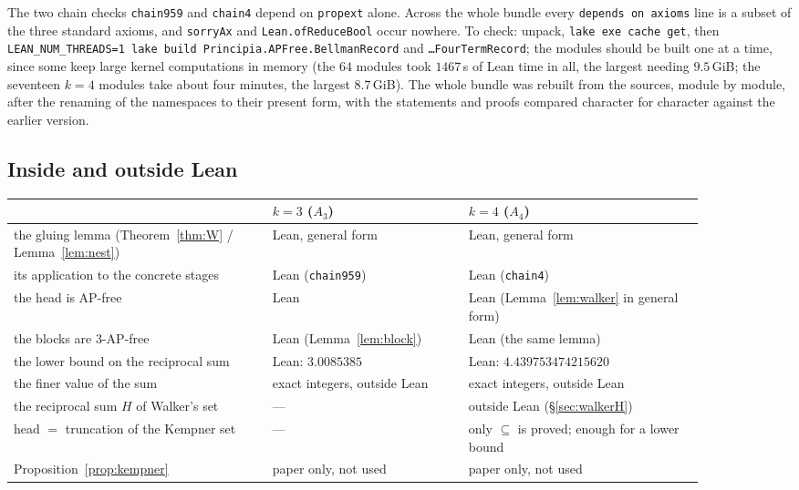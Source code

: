 \documentclass[11pt,a4paper]{article}
\theoremstyle{definition}
\theoremstyle{remark}
\newcommand{\code}[1]{\texttt{#1}}
\begin{document}
The two chain checks \code{chain959} and \code{chain4} depend on \code{propext} alone. Across the whole bundle every \code{depends on axioms} line is a subset of the three standard axioms, and \code{sorryAx} and \code{Lean.\allowbreak{}ofReduceBool} occur nowhere. To check: unpack, \code{lake exe cache get}, then \code{LEAN\_\allowbreak{}NUM\_\allowbreak{}THREADS=1 lake build Principia.\allowbreak{}APFree.\allowbreak{}BellmanRecord} and \code{\dots\allowbreak{}FourTermRecord}; the modules should be built one at a time, since some keep large kernel computations in memory (the $64$ modules took $1467$\,s of Lean time in all, the largest needing $9.5$\,GiB; the seventeen $k=4$ modules take about four minutes, the largest $8.7$\,GiB). The whole bundle was rebuilt from the sources, module by module, after the renaming of the namespaces to their present form, with the statements and proofs compared character for character against the earlier version.

\subsection{Inside and outside Lean}\label{sec:checked}

\begin{center}\small
\begin{tabular}{@{}>{\raggedright\arraybackslash}p{0.33\linewidth}>{\raggedright\arraybackslash}p{0.25\linewidth}>{\raggedright\arraybackslash}p{0.30\linewidth}@{}}
\toprule
 & $k=3$ ($A_3$) & $k=4$ ($A_4$) \\
\midrule
the gluing lemma (Theorem~\ref{thm:W} / Lemma~\ref{lem:nest}) & Lean, general form & Lean, general form \\
its application to the concrete stages & Lean (\code{chain959}) & Lean (\code{chain4}) \\
the head is AP-free & Lean & Lean (Lemma~\ref{lem:walker} in general form) \\
the blocks are 3-AP-free & Lean (Lemma~\ref{lem:block}) & Lean (the same lemma) \\
the lower bound on the reciprocal sum & Lean: $3.0085385$ & Lean: $4.439753474215620$ \\
the finer value of the sum & exact integers, outside Lean & exact integers, outside Lean \\
the reciprocal sum $H$ of Walker's set & --- & outside Lean (\S\ref{sec:walkerH}) \\
head $=$ truncation of the Kempner set & --- & only $\subseteq$ is proved; enough for a lower bound \\
Proposition~\ref{prop:kempner} & paper only, not used & paper only, not used \\
\bottomrule
\end{tabular}
\end{center}
\end{document}
